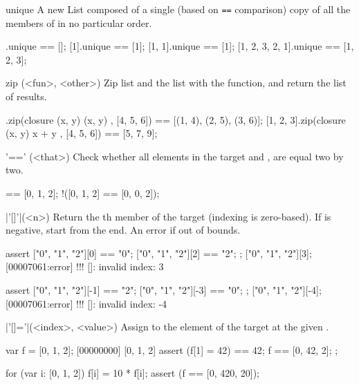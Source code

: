 \begin{urbiscriptapi}
\item[unique]%
  A new List composed of a single (based on \lstinline|==| comparison) copy
  of all the members of \this in no particular order.
\begin{urbiassert}
             [].unique == [];
            [1].unique == [1];
         [1, 1].unique == [1];
[1, 2, 3, 2, 1].unique == [1, 2, 3];
\end{urbiassert}


\item[zip](<fun>, <other>)%
  Zip \this list and the  list with the  function, and
  return the list of results.

\begin{urbiassert}
[1, 2, 3].zip(closure (x, y) { (x, y) }, [4, 5, 6])
       == [(1, 4), (2, 5), (3, 6)];
[1, 2, 3].zip(closure (x, y) { x + y }, [4, 5, 6])
       == [5, 7, 9];
\end{urbiassert}

\item['=='](<that>)%
Check whether all elements in the target and , are
equal two by two.

\begin{urbiassert}
[0, 1, 2] == [0, 1, 2];
!([0, 1, 2] == [0, 0, 2]);
\end{urbiassert}

\item|'[]'|(<n>)%
  Return the th member of the target (indexing is
  zero-based). If  is negative, start from the end.  An error
  if out of bounds.

\begin{urbiscript}
assert
{
  ["0", "1", "2"][0] == "0";
  ["0", "1", "2"][2] == "2";
};
["0", "1", "2"][3];
[00007061:error] !!! []: invalid index: 3

assert
{
  ["0", "1", "2"][-1] == "2";
  ["0", "1", "2"][-3] == "0";
};
["0", "1", "2"][-4];
[00007061:error] !!! []: invalid index: -4
\end{urbiscript}

\item|'[]='|(<index>, <value>)%
  Assign  to the element of the target at the given
  .

\begin{urbiscript}
var f = [0, 1, 2];
[00000000] [0, 1, 2]
assert
{
  (f[1] = 42) == 42;
  f == [0, 42, 2];
};

for (var i: [0, 1, 2])
  f[i] = 10 * f[i];
assert (f == [0, 420, 20]);
\end{urbiscript}


\end{urbiscriptapi}
